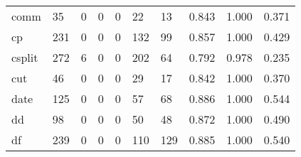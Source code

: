 \begin{longtable}{lp{1.3cm}p{1.3cm}p{1.3cm}p{1.3cm}p{1.3cm}p{1.3cm}p{1.3cm}p{1.3cm}p{1.3cm}}
comm      &                     35 &                                             0 &                                            0 &                                           0 &                                           22 &                                         13 &                                0.843 &                                  1.000 &                                0.371 \\
cp        &                    231 &                                             0 &                                            0 &                                           0 &                                          132 &                                         99 &                                0.857 &                                  1.000 &                                0.429 \\
csplit    &                    272 &                                             6 &                                            0 &                                           0 &                                          202 &                                         64 &                                0.792 &                                  0.978 &                                0.235 \\
cut       &                     46 &                                             0 &                                            0 &                                           0 &                                           29 &                                         17 &                                0.842 &                                  1.000 &                                0.370 \\
date      &                    125 &                                             0 &                                            0 &                                           0 &                                           57 &                                         68 &                                0.886 &                                  1.000 &                                0.544 \\
dd        &                     98 &                                             0 &                                            0 &                                           0 &                                           50 &                                         48 &                                0.872 &                                  1.000 &                                0.490 \\
df        &                    239 &                                             0 &                                            0 &                                           0 &                                          110 &                                        129 &                                0.885 &                                  1.000 &                                0.540 \\

\end{longtable}
